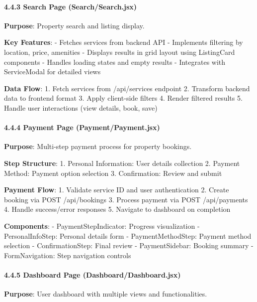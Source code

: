 \documentclass[12pt,a4paper]{article}
\begin{document}
\hypertarget{search-page-searchsearch.jsx}{%
\paragraph{4.4.3 Search Page
(Search/Search.jsx)}\label{search-page-searchsearch.jsx}}

\textbf{Purpose}: Property search and listing display.

\textbf{Key Features}: - Fetches services from backend API - Implements
filtering by location, price, amenities - Displays results in grid
layout using ListingCard components - Handles loading states and empty
results - Integrates with ServiceModal for detailed views

\textbf{Data Flow}: 1. Fetch services from /api/services endpoint 2.
Transform backend data to frontend format 3. Apply client-side filters
4. Render filtered results 5. Handle user interactions (view details,
book, save)

\hypertarget{payment-page-paymentpayment.jsx}{%
\paragraph{4.4.4 Payment Page
(Payment/Payment.jsx)}\label{payment-page-paymentpayment.jsx}}

\textbf{Purpose}: Multi-step payment process for property bookings.

\textbf{Step Structure}: 1. Personal Information: User details
collection 2. Payment Method: Payment option selection 3. Confirmation:
Review and submit

\textbf{Payment Flow}: 1. Validate service ID and user authentication 2.
Create booking via POST /api/bookings 3. Process payment via POST
/api/payments 4. Handle success/error responses 5. Navigate to dashboard
on completion

\textbf{Components}: - PaymentStepIndicator: Progress visualization -
PersonalInfoStep: Personal details form - PaymentMethodStep: Payment
method selection - ConfirmationStep: Final review - PaymentSidebar:
Booking summary - FormNavigation: Step navigation controls

\hypertarget{dashboard-page-dashboarddashboard.jsx}{%
\paragraph{4.4.5 Dashboard Page
(Dashboard/Dashboard.jsx)}\label{dashboard-page-dashboarddashboard.jsx}}

\textbf{Purpose}: User dashboard with multiple views and
functionalities.
\end{document}
